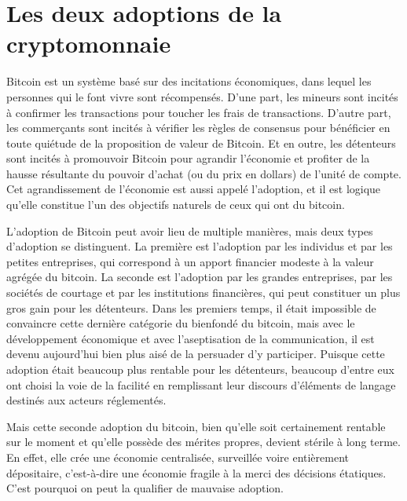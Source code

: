 \section*{Les deux adoptions de la cryptomonnaie}

Bitcoin est un système basé sur des incitations économiques, dans lequel les personnes qui le font vivre sont récompensés. D'une part, les mineurs sont incités à confirmer les transactions pour toucher les frais de transactions. D'autre part, les commerçants sont incités à vérifier les règles de consensus pour bénéficier en toute quiétude de la proposition de valeur de Bitcoin. Et en outre, les détenteurs sont incités à promouvoir Bitcoin pour agrandir l'économie et profiter de la hausse résultante du pouvoir d'achat (ou du prix en dollars) de l'unité de compte. Cet agrandissement de l'économie est aussi appelé l'adoption, et il est logique qu'elle constitue l'un des objectifs naturels de ceux qui ont du bitcoin.

L'adoption de Bitcoin peut avoir lieu de multiple manières, mais deux types d'adoption se distinguent. La première est l'adoption par les individus et par les petites entreprises, qui correspond à un apport financier modeste à la valeur agrégée du bitcoin. La seconde est l'adoption par les grandes entreprises, par les sociétés de courtage et par les institutions financières, qui peut constituer un plus gros gain pour les détenteurs. Dans les premiers temps, il était impossible de convaincre cette dernière catégorie du bienfondé du bitcoin, mais avec le développement économique et avec l'aseptisation de la communication, il est devenu aujourd'hui bien plus aisé de la persuader d'y participer. Puisque cette adoption était beaucoup plus rentable pour les détenteurs, beaucoup d'entre eux ont choisi la voie de la facilité en remplissant leur discours d'éléments de langage destinés aux acteurs réglementés.

Mais cette seconde adoption du bitcoin, bien qu'elle soit certainement rentable sur le moment et qu'elle possède des mérites propres, devient stérile à long terme. En effet, elle crée une économie centralisée, surveillée voire entièrement dépositaire, c'est-à-dire une économie fragile à la merci des décisions étatiques. C'est pourquoi on peut la qualifier de mauvaise adoption.

